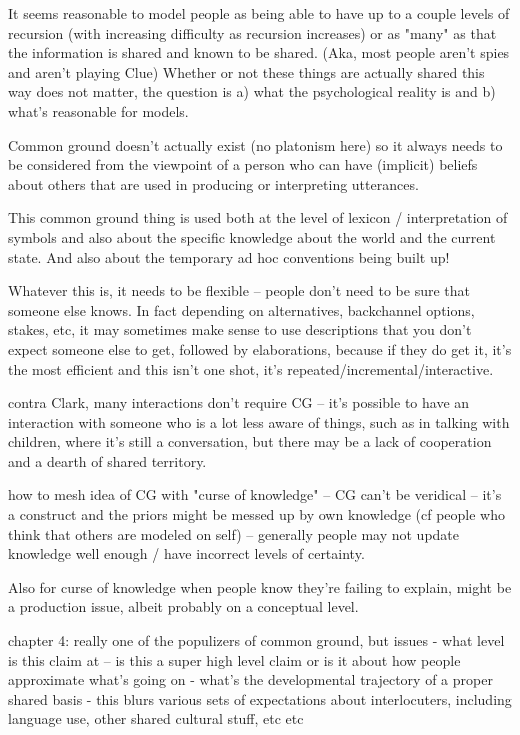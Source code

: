 \documentclass[]{article}
\begin{document}
It seems reasonable to model people as being able to have up to a couple levels of recursion (with increasing difficulty as recursion increases) or as "many" as that the information is shared and known to be shared. (Aka, most people aren't spies and aren't playing Clue) Whether or not these things are actually shared this way does not matter, the question is a) what the psychological reality is and b) what's reasonable for models. 

Common ground doesn't actually exist (no platonism here) so it always needs to be considered from the viewpoint of a person who can have (implicit) beliefs about others that are used in producing or interpreting utterances. 

This common ground thing is used both at the level of lexicon / interpretation of symbols and also about the specific knowledge about the world and the current state. And also about the temporary ad hoc conventions being built up! 

Whatever this is, it needs to be flexible -- people don't need to be sure that someone else knows. In fact depending on alternatives, backchannel options, stakes, etc, it may sometimes make sense to use descriptions that you don't expect someone else to get, followed by elaborations, because if they do get it, it's the most efficient and this isn't one shot, it's repeated/incremental/interactive. 

\cite{clark1996} contra Clark, many interactions don't require CG -- it's possible to have an interaction with someone who is a lot less aware of things, such as in talking with children, where it's still a conversation, but there may be a lack of cooperation and a dearth of shared territory. 

how to mesh idea of CG with "curse of knowledge" -- CG can't be veridical -- it's a construct and the priors might be messed up by own knowledge (cf people who think that others are modeled on self) -- generally  people may not update knowledge well enough / have incorrect levels of certainty. 

Also for curse of knowledge when people know they're failing to explain, might be a production issue, albeit probably on a conceptual level. 

\cite{clark1996} chapter 4: really one of the populizers of common ground, but issues
- what level is this claim at -- is this a super high level claim or is it about how people approximate what's going on
- what's the developmental trajectory of a proper shared basis
- this blurs various sets of expectations about interlocuters, including language use, other shared cultural stuff, etc etc
\end{document}
